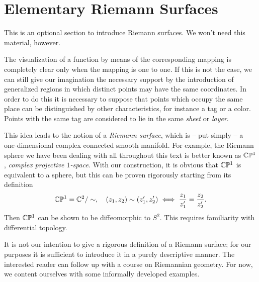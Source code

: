 \section{Elementary Riemann Surfaces}
This is an optional section to introduce Riemann surfaces. We won't need this material, however.

The visualization of a function by means of the corresponding mapping is completely clear only when the mapping is one to one. If this is not the case, we can still give our imagination the necessary support by the introduction of generalized regions in which distinct points may have the same coordinates. In order to do this it is necessary to suppose that points which occupy the same place can be distinguished by other characteristics, for instance a tag or a color. Points with the same tag are considered to lie in the same \emph{sheet} or \emph{layer}.

This idea leads to the notion of a \emph{Riemann surface}, which is -- put simply -- a one-dimensional complex connected smooth manifold. For example, the Riemann sphere we have been dealing with all throughout this text is better known as $\mathbb C\mathbb P^1$, \emph{complex projective $1$-space}. With our construction, it is obvious that $\mathbb C\mathbb P^1$ is equivalent to a sphere, but this can be proven rigorously starting from its definition $$\mathbb C\mathbb P^1=\mathbb C^2 \slash \sim, \quad (z_1,z_2) \sim (z_1',z_2') \iff \dfrac{z_1}{z_1'}=\dfrac{z_2}{z_2'}.$$ Then $\mathbb C\mathbb P^1$ can be shown to be diffeomorphic to $S^2$. This requires familiarity with differential topology.

It is not our intention to give a rigorous definition of a Riemann surface; for our purposes it is sufficient to introduce it in a purely descriptive manner. The interested reader can follow up with a course on Riemannian geometry. For now, we content ourselves with some informally developed examples.

